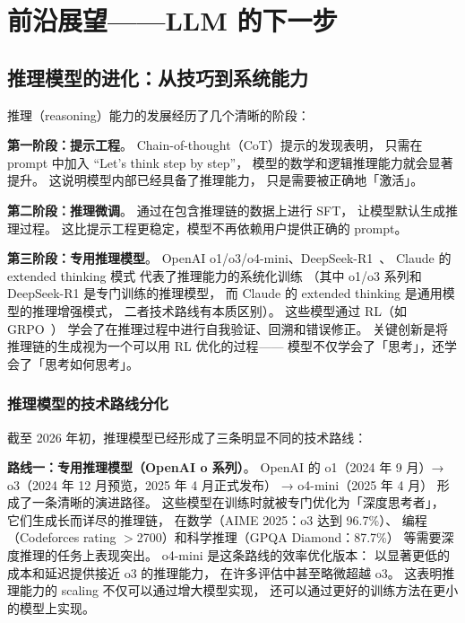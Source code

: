 \chapter{前沿展望——LLM 的下一步}
\label{ch:outlook}

\section{推理模型的进化：从技巧到系统能力}

推理（reasoning）能力的发展经历了几个清晰的阶段：

\textbf{第一阶段：提示工程}。
Chain-of-thought（CoT）提示的发现表明，
只需在 prompt 中加入 “Let's think step by step”，
模型的数学和逻辑推理能力就会显著提升。
这说明模型内部已经具备了推理能力，
只是需要被正确地「激活」。

\textbf{第二阶段：推理微调}。
通过在包含推理链的数据上进行 SFT，
让模型默认生成推理过程。
这比提示工程更稳定，模型不再依赖用户提供正确的 prompt。

\textbf{第三阶段：专用推理模型}。
OpenAI o1/o3/o4-mini、DeepSeek-R1~\cite{deepseekr1}、
Claude 的 extended thinking 模式
代表了推理能力的系统化训练
（其中 o1/o3 系列和 DeepSeek-R1 是专门训练的推理模型，
而 Claude 的 extended thinking 是通用模型的推理增强模式，
二者技术路线有本质区别）。
这些模型通过 RL（如 GRPO~\cite{shao2024grpo}）
学会了在推理过程中进行自我验证、回溯和错误修正。
关键创新是将推理链的生成视为一个可以用 RL 优化的过程——
模型不仅学会了「思考」，还学会了「思考如何思考」。

\subsection{推理模型的技术路线分化}

截至 2026 年初，推理模型已经形成了三条明显不同的技术路线：

\textbf{路线一：专用推理模型（OpenAI o 系列）}。
OpenAI 的 o1（2024 年 9 月）→ o3（2024 年 12 月预览，2025 年 4 月正式发布）
→ o4-mini（2025 年 4 月）
形成了一条清晰的演进路径。
这些模型在训练时就被专门优化为「深度思考者」，
它们生成长而详尽的推理链，
在数学（AIME 2025：o3 达到 96.7\%）、
编程（Codeforces rating $>$2700）和科学推理（GPQA Diamond：87.7\%）
等需要深度推理的任务上表现突出。
o4-mini 是这条路线的效率优化版本：
以显著更低的成本和延迟提供接近 o3 的推理能力，
在许多评估中甚至略微超越 o3。
这表明推理能力的 scaling 不仅可以通过增大模型实现，
还可以通过更好的训练方法在更小的模型上实现。

